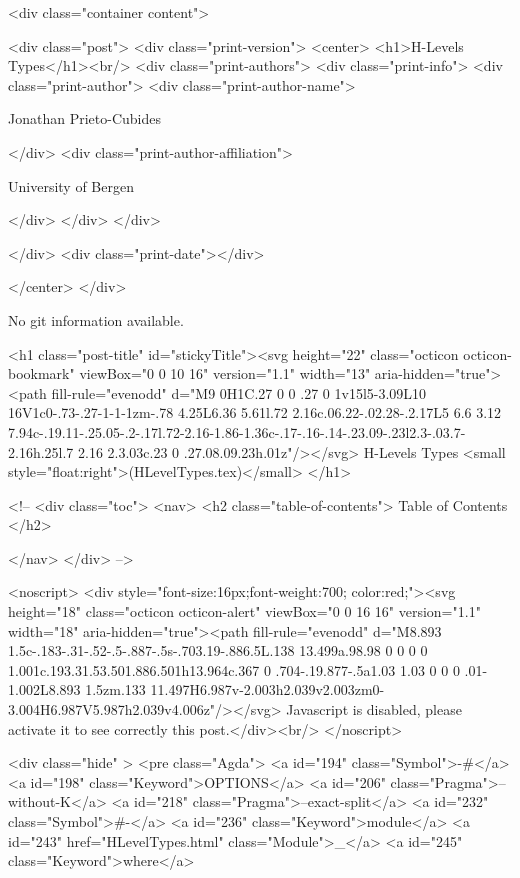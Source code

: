       <div class="container content">
        







<div class="post">
  <div class="print-version">
    <center>
      <h1>H-Levels Types</h1><br/>
        <div class="print-authors">
          <div class="print-info">
            <div class="print-author">
              <div class="print-author-name">
                
                  Jonathan Prieto-Cubides
                
              </div>
              <div class="print-author-affiliation">
                
                  University of Bergen
                
                </div>
            </div>
          </div>
          
          
        </div>
        <div class="print-date"></div>
        
        
    </center>
  </div>

  
  No git information available.
  

  <h1 class="post-title" id="stickyTitle"><svg height="22" class="octicon octicon-bookmark" viewBox="0 0 10 16" version="1.1" width="13" aria-hidden="true"><path fill-rule="evenodd" d="M9 0H1C.27 0 0 .27 0 1v15l5-3.09L10 16V1c0-.73-.27-1-1-1zm-.78 4.25L6.36 5.61l.72 2.16c.06.22-.02.28-.2.17L5 6.6 3.12 7.94c-.19.11-.25.05-.2-.17l.72-2.16-1.86-1.36c-.17-.16-.14-.23.09-.23l2.3-.03.7-2.16h.25l.7 2.16 2.3.03c.23 0 .27.08.09.23h.01z"/></svg> H-Levels Types <small style="float:right">(HLevelTypes.tex)</small>
  </h1>

  <!-- 
  <div class="toc">
    <nav>
    <h2 class="table-of-contents"> Table of Contents </h2>
      

    </nav>
  </div>
   -->

  <noscript>
  <div style="font-size:16px;font-weight:700; color:red;"><svg height="18" class="octicon octicon-alert" viewBox="0 0 16 16" version="1.1" width="18" aria-hidden="true"><path fill-rule="evenodd" d="M8.893 1.5c-.183-.31-.52-.5-.887-.5s-.703.19-.886.5L.138 13.499a.98.98 0 0 0 0 1.001c.193.31.53.501.886.501h13.964c.367 0 .704-.19.877-.5a1.03 1.03 0 0 0 .01-1.002L8.893 1.5zm.133 11.497H6.987v-2.003h2.039v2.003zm0-3.004H6.987V5.987h2.039v4.006z"/></svg> Javascript is disabled, please activate it to see correctly this post.</div><br/>
  </noscript>

  <div class="hide" >
<pre class="Agda">
<a id="194" class="Symbol">{-#</a> <a id="198" class="Keyword">OPTIONS</a> <a id="206" class="Pragma">--without-K</a> <a id="218" class="Pragma">--exact-split</a> <a id="232" class="Symbol">#-}</a>
<a id="236" class="Keyword">module</a> <a id="243" href="HLevelTypes.html" class="Module">_</a> <a id="245" class="Keyword">where</a>

